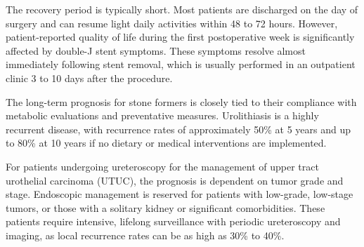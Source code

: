The recovery period is typically short. Most patients are discharged on the day of surgery and can resume light daily activities within 48 to 72 hours. However, patient-reported quality of life during the first postoperative week is significantly affected by double-J stent symptoms. These symptoms resolve almost immediately following stent removal, which is usually performed in an outpatient clinic 3 to 10 days after the procedure.

The long-term prognosis for stone formers is closely tied to their compliance with metabolic evaluations and preventative measures. Urolithiasis is a highly recurrent disease, with recurrence rates of approximately 50\% at 5 years and up to 80\% at 10 years if no dietary or medical interventions are implemented.

For patients undergoing ureteroscopy for the management of upper tract urothelial carcinoma (UTUC), the prognosis is dependent on tumor grade and stage. Endoscopic management is reserved for patients with low-grade, low-stage tumors, or those with a solitary kidney or significant comorbidities. These patients require intensive, lifelong surveillance with periodic ureteroscopy and imaging, as local recurrence rates can be as high as 30\% to 40\%.

